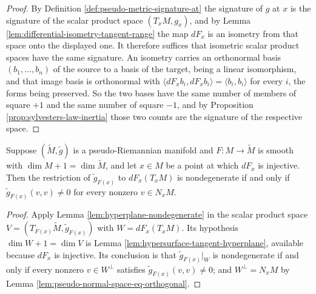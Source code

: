 \begin{proof}
\leanok
{}
By Definition \ref{def:pseudo-metric-signature-at} the signature of $g$ at $x$ is the signature of the scalar product space $(T_xM, g_x)$, and by Lemma \ref{lem:differential-isometry-tangent-range} the map $dF_x$ is an isometry from that space onto the displayed one. It therefore suffices that isometric scalar product spaces have the same signature. An isometry carries an orthonormal basis $(b_1,\ldots,b_n)$ of the source to a basis of the target, being a linear isomorphism, and that image basis is orthonormal with $\langle dF_xb_i, dF_xb_i\rangle = \langle b_i,b_i\rangle$ for every $i$, the forms being preserved. So the two bases have the same number of members of square $+1$ and the same number of square $-1$, and by Proposition \ref{prop:sylvesters-law-inertia} those two counts are the signature of the respective space.
\end{proof}

\begin{proposition}
\label{prop:pseudo-riemannian-hypersurface-nondegenerate}
\leanok
{}
Suppose $(\tilde{M},\tilde{g})$ is a pseudo-Riemannian manifold and $F : M \to \tilde{M}$ is smooth with $\dim M + 1 = \dim\tilde{M}$, and let $x \in M$ be a point at which $dF_x$ is injective. Then the restriction of $\tilde{g}_{F(x)}$ to $dF_x(T_xM)$ is nondegenerate if and only if $\tilde{g}_{F(x)}(v,v) \neq 0$ for every nonzero $v \in N_xM$.
\end{proposition}

\begin{proof}
\leanok
{}
Apply Lemma \ref{lem:hyperplane-nondegenerate} in the scalar product space $V = (T_{F(x)}\tilde{M}, \tilde{g}_{F(x)})$ with $W = dF_x(T_xM)$. Its hypothesis $\dim W + 1 = \dim V$ is Lemma \ref{lem:hypersurface-tangent-hyperplane}, available because $dF_x$ is injective. Its conclusion is that $\tilde{g}_{F(x)}|_W$ is nondegenerate if and only if every nonzero $v \in W^\perp$ satisfies $\tilde{g}_{F(x)}(v,v) \neq 0$; and $W^\perp = N_xM$ by Lemma \ref{lem:pseudo-normal-space-eq-orthogonal}.
\end{proof}

